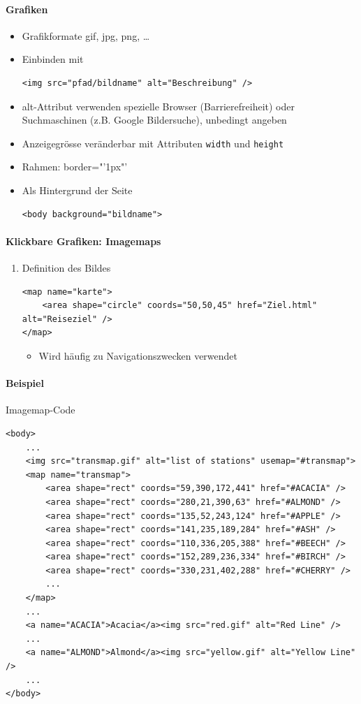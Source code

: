 \documentclass[10pt,a4paper]{article}
\begin{document}
\paragraph{Grafiken}
\begin{itemize}[noitemsep,topsep=0pt,leftmargin=*]
    \item Grafikformate gif, jpg, png, \dots
    \item Einbinden mit
    \begin{lstlisting}
<img src="pfad/bildname" alt="Beschreibung" />
    \end{lstlisting}
    \item alt-Attribut verwenden spezielle Browser (Barrierefreiheit) oder Suchmaschinen (z.B. Google Bildersuche), unbedingt angeben
    \item Anzeigegrösse veränderbar mit Attributen \texttt{width} und \texttt{height}
    \item Rahmen: border="'1px"' %
    \item Als Hintergrund der Seite
    \begin{lstlisting}
<body background="bildname">
    \end{lstlisting}
\end{itemize}

\paragraph{Klickbare Grafiken: Imagemaps}
\begin{enumerate}[noitemsep,topsep=0pt,leftmargin=*]
    \item Definition des Bildes
    \begin{lstlisting}
<map name="karte">
    <area shape="circle" coords="50,50,45" href="Ziel.html" alt="Reiseziel" />
</map>
    \end{lstlisting}
    \begin{itemize}[noitemsep,topsep=0pt,leftmargin=*]
        \item Wird häufig zu Navigationszwecken verwendet
    \end{itemize}
\end{enumerate}

\paragraph{Beispiel}Imagemap-Code
\begin{lstlisting}
<body>
    ...
    <img src="transmap.gif" alt="list of stations" usemap="#transmap">
    <map name="transmap">
        <area shape="rect" coords="59,390,172,441" href="#ACACIA" />
        <area shape="rect" coords="280,21,390,63" href="#ALMOND" />
        <area shape="rect" coords="135,52,243,124" href="#APPLE" />
        <area shape="rect" coords="141,235,189,284" href="#ASH" />
        <area shape="rect" coords="110,336,205,388" href="#BEECH" />
        <area shape="rect" coords="152,289,236,334" href="#BIRCH" />
        <area shape="rect" coords="330,231,402,288" href="#CHERRY" />
        ...
    </map>
    ...
    <a name="ACACIA">Acacia</a><img src="red.gif" alt="Red Line" />
    ...
    <a name="ALMOND">Almond</a><img src="yellow.gif" alt="Yellow Line" />
    ...
</body>
\end{lstlisting}
\end{document}
